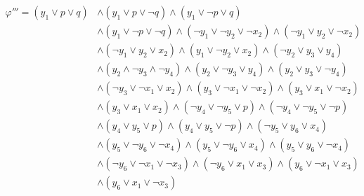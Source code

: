 \documentclass[a4paper]{article}
\begin{document}
\begin{align*}
    \varphi''' = \left(y_{1} \lor p \lor q\right) & \land \left(y_{1} \lor p \lor \neg q\right) \land \left(y_{1} \lor \neg p \lor q\right) \\
                & \land \left(y_{1} \lor \neg p \lor \neg q\right) \land \left(\neg y_{1} \lor \neg y_{2} \lor \neg x_{2}\right) \land \left( \neg y_{1} \lor y_{2} \lor \neg x_{2}\right) \\ 
                & \land \left(\neg y_{1} \lor y_{2} \lor x_{2}\right) \land \left( y_{1} \lor \neg y_{2} \lor x_{2}\right) \land \left( \neg y_{2} \lor y_{3} \lor y_{4}\right) \\ 
                & \land \left(y_{2} \land \neg y_{3} \land \neg y_{4}\right) \land \left(y_{2} \lor  \neg y_{3} \lor  y_{4}\right) \land \left(y_{2} \lor y_{3} \lor \neg y_{4} \right) \\
                & \land \left(\neg y_{3} \lor \neg x_{1} \lor x_{2}\right) \land \left(y_{3} \lor \neg x_{1} \lor \neg x_{2}\right) \land \left(y_{3} \lor x_{1} \lor \neg x_{2}\right) \\ 
                & \land \left(y_{3} \lor x_{1} \lor x_{2}\right) \land \left(\neg y_{4} \lor \neg y_{5} \lor p\right) \land \left(\neg y_{4} \lor \neg y_{5} \lor \neg p\right) \\
                & \land \left(y_{4} \lor y_{5} \lor p\right) \land \left(y_{4} \lor y_{5} \lor \neg p\right) \land \left(\neg y_{5} \lor y_{6} \lor x_{4}\right) \\
                & \land \left(y_{5} \lor \neg y_{6} \lor \neg x_{4}\right) \land \left(y_{5} \lor \neg y_{6} \lor x_{4} \right) \land \left(y_{5} \lor y_{6} \lor \neg x_{4}\right) \\ 
                & \land \left(\neg y_{6} \lor \neg x_{1} \lor \neg x_{3}\right) \land \left(\neg y_{6} \lor x_{1} \lor x_{3}\right) \land \left(y_{6} \lor \neg x_{1} \lor x_{3}\right) \\
                & \land \left(y_{6} \lor x_{1} \lor \neg x_{3}\right)
\end{align*}
\end{document}
